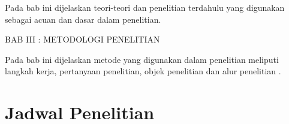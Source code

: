 Pada bab ini dijelaskan teori-teori dan penelitian terdahulu yang digunakan sebagai acuan dan dasar dalam penelitian.

BAB III : METODOLOGI PENELITIAN

Pada bab ini dijelaskan metode yang digunakan dalam penelitian meliputi langkah kerja, pertanyaan penelitian, objek penelitian dan alur penelitian .

\section{Jadwal Penelitian}

\begin{comment}

\end{comment}